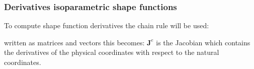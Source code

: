 \documentclass[notes]{beamer}
\begin{document}
\begin{frame}
\frametitle{Derivatives isoparametric shape functions}
To compute shape function derivatives the chain rule will be used:

written as matrices and vectors this becomes:
$\mathbf{J}^e$ is the Jacobian which contains the derivatives of the physical coordinates with respect
to the natural coordinates.
\end{frame}
\end{document}
